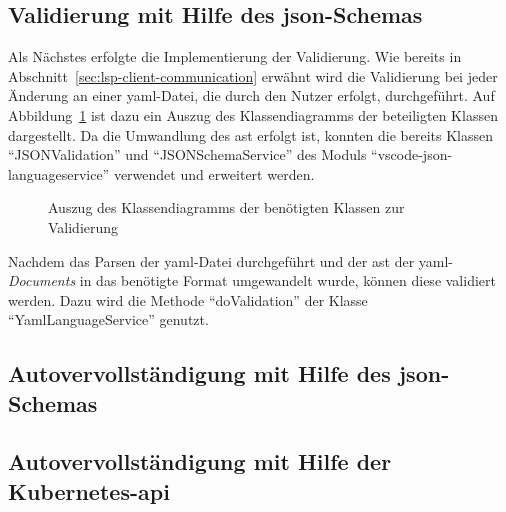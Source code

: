 \subsection{Validierung mit Hilfe des \acs{json}-Schemas}

Als Nächstes erfolgte die Implementierung der Validierung. Wie bereits in Abschnitt~\ref{sec:lsp-client-communication} erwähnt wird die
Validierung bei jeder Änderung an einer \ac{yaml}-Datei, die durch den Nutzer erfolgt, durchgeführt.
Auf Abbildung~\ref{fig:class-diagram-yaml-language-service-validation} ist dazu ein Auszug des Klassendiagramms der beteiligten Klassen dargestellt.
Da die Umwandlung des \ac{ast} erfolgt ist, konnten die bereits Klassen ``JSONValidation'' und ``JSONSchemaService''
des Moduls ``vscode-json-languageservice'' verwendet und erweitert werden.



\begin{figure}[htp] %
      \centering
      \caption{Auszug des Klassendiagramms der benötigten Klassen zur Validierung}
      \label{fig:class-diagram-yaml-language-service-validation}
\end{figure}

Nachdem das Parsen der \ac{yaml}-Datei durchgeführt und der \ac{ast} der \ac{yaml}-\textit{Documents}  in das benötigte Format umgewandelt wurde, können diese
validiert werden. Dazu wird die Methode ``doValidation'' der Klasse ``YamlLanguageService'' genutzt.


\subsection{Autovervollständigung mit Hilfe des \acs{json}-Schemas}

\subsection{Autovervollständigung mit Hilfe der Kubernetes-\acs{api}}

